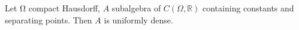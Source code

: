 Let Ω compact Hausdorff, $A$ subalgebra of $C(\Omega,\mathbb{R})$ containing constants and separating points. Then $A$ is uniformly dense.
